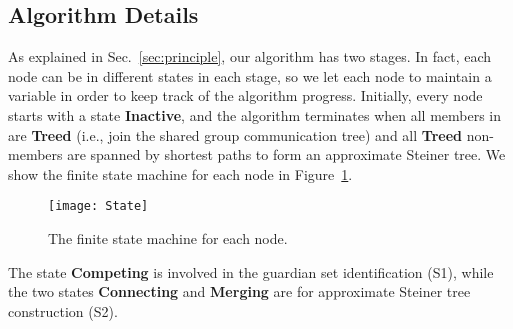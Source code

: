 \documentclass[10pt, conference, compsocconf]{IEEEtran}
\begin{document}
  \subsection{Algorithm Details}
As explained in Sec.~\ref{sec:principle}, our algorithm has two stages. In fact, each node can be in different states in each stage, so we let each node  to maintain a variable  in order to keep track of the algorithm progress. Initially, every node starts with a state \textbf{Inactive}, and the algorithm terminates when all members in  are \textbf{Treed} (i.e., join the shared group communication tree) and all \textbf{Treed} non-members are spanned by shortest paths to form an approximate Steiner tree. We show the finite state machine for each node in Figure~\ref{fig:state}.
\begin{figure}[htbp]
      \centerline{\texttt{[image: State]}}
      \caption{The finite state machine for each node.}
      \label{fig:state}
    \end{figure}
The state \textbf{Competing} is involved in the guardian set identification (S1), while the two states \textbf{Connecting} and \textbf{Merging} are for approximate Steiner tree construction (S2).
\end{document}
